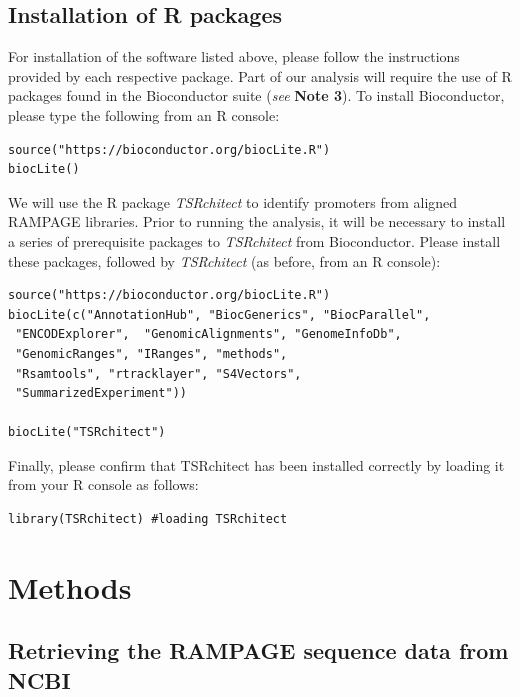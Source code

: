 \documentclass[runningheads,a4paper]{llncs}
\begin{document}
\begin{linenumbers}
\subsection{Installation of R packages}
For installation of the software listed above, please follow the instructions provided by each respective package. 
Part of our analysis will require the use of R packages found in the Bioconductor suite \cite{Lawrence:2014gy} (\textit{see} \textbf{Note 3}).
To install Bioconductor, please type the following from an R console: 

\noindent
\begin{verbatim}
source("https://bioconductor.org/biocLite.R")
biocLite()
\end{verbatim}

\noindent
We will use the R package \textit{TSRchitect} to identify promoters from aligned RAMPAGE libraries. 
Prior to running the analysis, it will be necessary to install a series of prerequisite packages to \textit{TSRchitect} from Bioconductor.
Please install these packages, followed by \textit{TSRchitect} (as before, from an R console):

\noindent
\begin{verbatim}
source("https://bioconductor.org/biocLite.R")
biocLite(c("AnnotationHub", "BiocGenerics", "BiocParallel",
 "ENCODExplorer",  "GenomicAlignments", "GenomeInfoDb",
 "GenomicRanges", "IRanges", "methods", 
 "Rsamtools", "rtracklayer", "S4Vectors",
 "SummarizedExperiment"))

biocLite("TSRchitect")
\end{verbatim}

\noindent
Finally, please confirm that TSRchitect has been installed correctly by loading it from your R console as follows:

\noindent
\begin{verbatim}
library(TSRchitect) #loading TSRchitect
\end{verbatim}

\section{Methods}

\subsection{Retrieving the RAMPAGE sequence data from NCBI}


\end{linenumbers}
\end{document}
